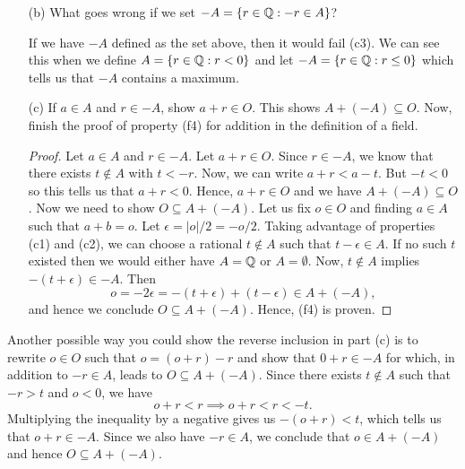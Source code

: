 \begin{enumerate}
\begin{proof}
        Finally, we show (c3). Suppose \( r \in -A  \). Then there exists \( t \notin A  \) such that \( -r > t  \). Multiplying through the inequality by a negative gives us \( r < -t  \) which is our desired result. Hence, \( -A  \) defines a cut.
        \end{proof}
    \item[(b)] What goes wrong if we set \( -A = \{ r \in \mathbb{Q} : -r \in A  \}  \)?
        \begin{explanation}
        If we have \( -A  \) defined as the set above, then it would fail (c3). We can see this when we define \(  A = \{ r \in \mathbb{Q} : r < 0  \}  \) and let \( -A = \{ r \in \mathbb{Q} : r \leq  0 \}   \) which tells us that \( -A  \) contains a maximum.
        \end{explanation}
    \item[(c)] If \( a \in A  \) and \( r \in -A  \), show \( a + r \in O  \). This shows \( A + (-A ) \subseteq O  \). Now, finish the proof of property (f4) for addition in the definition of a field.
        \begin{proof}
            Let \( a \in A  \) and \( r \in -A  \). Let \( a + r \in O  \). Since \( r \in -A  \), we know that there exists \( t \notin A  \) with \( t < -r  \). Now, we can write \( a + r < a - t    \). But \( -t < 0  \) so this tells us that \( a + r < 0  \). Hence, \( a + r \in O  \) and we have \( A + (-A) \subseteq O  \). Now we need to show \( O \subseteq A + (-A)  \). Let us fix \( o \in O  \) and finding \( a \in A  \) such that \( a + b = o  \). Let \( \epsilon  = | o | / 2 = -o / 2  \). Taking advantage of properties (c1) and (c2), we can choose a rational \( t \notin A  \) such that \( t - \epsilon \in A  \). If no such \( t  \) existed then we would either have \( A = \mathbb{Q}  \) or \( A = \emptyset \). Now, \( t \notin A   \) implies \( -(t+\epsilon ) \in -A  \). Then 
            \[ o = -2 \epsilon = -(t+\epsilon ) + (t-\epsilon ) \in A + (-A ), \] and hence we conclude \( O \subseteq A + (-A) \). Hence, (f4) is proven.
        \end{proof}
\end{enumerate}

\begin{remark}
   Another possible way you could show the reverse inclusion in part (c) is to rewrite \( o \in O  \) such that \( o = (o+r) - r  \) and show that \( 0+r  \in -A \) for which, in addition to \( -r \in A  \), leads to \( O \subseteq A + (-A ) \). Since there exists \( t \notin A  \) such that \( -r > t  \) and \( o < 0  \), we have 
   \[  o+r < r \implies o + r < r < -t.   \]
   Multiplying the inequality by a negative gives us \( -(o+r) < t  \), which tells us that \( o +r \in -A  \). Since we also have \( - r \in A   \), we conclude that \( o \in A + (-A )  \) and hence \( O \subseteq A + (-A) \).
\end{remark}

